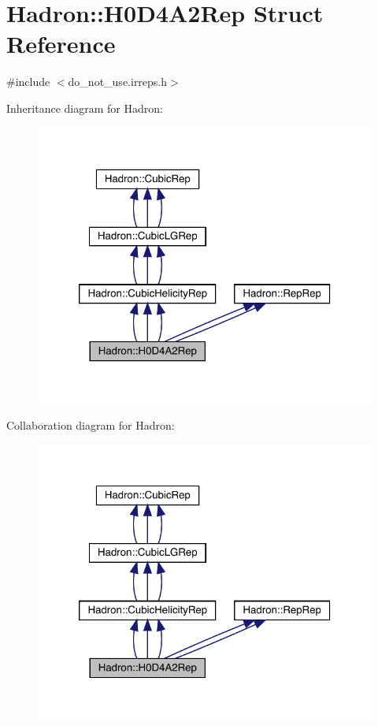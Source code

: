 \hypertarget{structHadron_1_1H0D4A2Rep}{}\section{Hadron\+:\+:H0\+D4\+A2\+Rep Struct Reference}
\label{structHadron_1_1H0D4A2Rep}


{\ttfamily \#include $<$do\+\_\+not\+\_\+use.\+irreps.\+h$>$}



Inheritance diagram for Hadron\+:
\nopagebreak
\begin{figure}[H]
\begin{center}
\leavevmode
\includegraphics[width=320pt]{dd/d8a/structHadron_1_1H0D4A2Rep__inherit__graph}
\end{center}
\end{figure}


Collaboration diagram for Hadron\+:
\nopagebreak
\begin{figure}[H]
\begin{center}
\leavevmode
\includegraphics[width=320pt]{da/d42/structHadron_1_1H0D4A2Rep__coll__graph}
\end{center}
\end{figure}
